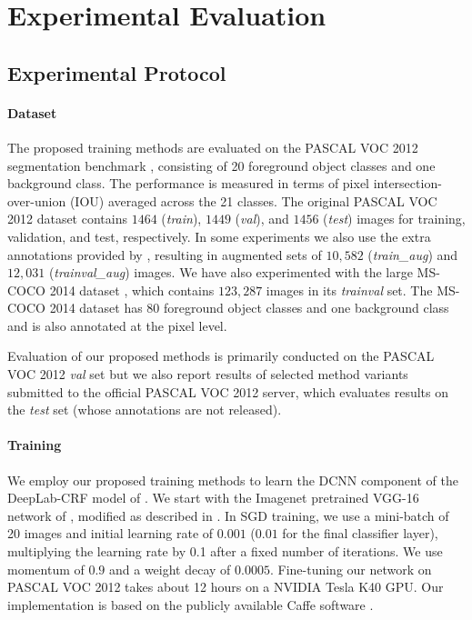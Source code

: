 \section{Experimental Evaluation}
\label{sec:experiments}

\subsection{Experimental Protocol}

\paragraph{Dataset} 
\label{sec:dataset}

The proposed training methods are evaluated on the PASCAL
VOC 2012 segmentation benchmark \citep{everingham2014pascal},
consisting of 20 foreground object classes and one background
class. The performance is measured in terms of pixel
intersection-over-union (IOU) averaged across the 21 classes. The
original PASCAL VOC 2012 dataset contains $1464$ (\textsl{train}),
$1449$ (\textsl{val}), and $1456$ (\textsl{test}) images for training,
validation, and test, respectively. In some experiments we also use
the extra annotations provided by \citet{hariharan2011semantic},
resulting in augmented sets of $10,582$ (\textsl{train\_aug}) and
$12,031$ (\textsl{trainval\_aug}) images. We have also experimented
with the large MS-COCO 2014 dataset \citep{lin2014microsoft}, which
contains $123,287$ images in its \textsl{trainval} set. The MS-COCO
2014 dataset has $80$ foreground object classes and one background
class and is also annotated at the pixel level.

Evaluation of our proposed methods is primarily conducted on the
PASCAL VOC 2012 \textsl{val} set but we also report results of selected
method variants submitted to the official PASCAL VOC 2012 server, which
evaluates results on the \textsl{test} set (whose annotations are not
released).

\paragraph{Training}

We employ our proposed training methods to learn the DCNN component of
the DeepLab-CRF model of \citet{chen2014semantic}. We start with the
Imagenet pretrained VGG-16 network of \citet{simonyan2014very},
modified as described in \citet{chen2014semantic}. In SGD training, we
use a mini-batch of 20 images and initial learning rate of $0.001$
($0.01$ for the final classifier layer), multiplying the learning rate
by 0.1 after a fixed number of iterations. We use momentum of $0.9$
and a weight decay of $0.0005$. Fine-tuning our network on PASCAL VOC
2012 takes about 12 hours on a NVIDIA Tesla K40 GPU. Our
implementation is based on the publicly available Caffe software
\citep{jia2014caffe}.

